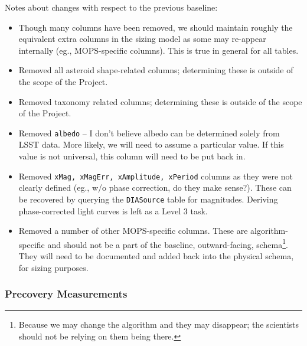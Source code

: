 \documentclass[12pt]{article}
\newcommand{\code}[1]{\texttt{#1}}
\newcommand{\DIASource}{\code{DIASource}\xspace}
\begin{document}
\begin{changelog}
Notes about changes with respect to the previous baseline:
\begin{itemize}
\item Though many columns have been removed, we should maintain roughly the equivalent extra columns in the sizing model as some may re-appear internally (eg., MOPS-specific columns). This is true in general for all tables.
\item Removed all asteroid shape-related columns; determining these is outside of the scope of the Project.
\item Removed taxonomy related columns; determining these is outside of the scope of the Project.
\item Removed \texttt{albedo} -- I don't believe albedo can be determined solely from LSST data. More likely, we will need to assume a particular value. If this value is not universal, this column will need to be put back in.
\item Removed \texttt{xMag, xMagErr, xAmplitude, xPeriod} columns as they were not clearly defined (eg., w/o phase correction, do they make sense?). These can be recovered by querying the \DIASource table for magnitudes. Deriving phase-corrected light curves is left as a Level 3 task.
\item Removed a number of other MOPS-specific columns. These are algorithm-specific and should not be a part of the baseline, outward-facing, schema\footnote{Because we may change the algorithm and they may disappear; the scientists should not be relying on them being there.}. They will need to be documented and added back into the physical schema, for sizing purposes.
\end{itemize}
\end{changelog}

\subsubsection{Precovery Measurements}
\end{document}
